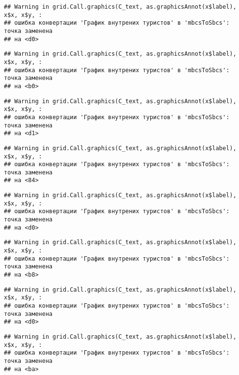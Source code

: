 \documentclass[
]{article}
\begin{document}
\begin{verbatim}
## Warning in grid.Call.graphics(C_text, as.graphicsAnnot(x$label), x$x, x$y, :
## ошибка конвертации 'График внутрених туристов' в 'mbcsToSbcs': точка заменена
## на <d0>
\end{verbatim}

\begin{verbatim}
## Warning in grid.Call.graphics(C_text, as.graphicsAnnot(x$label), x$x, x$y, :
## ошибка конвертации 'График внутрених туристов' в 'mbcsToSbcs': точка заменена
## на <b0>
\end{verbatim}

\begin{verbatim}
## Warning in grid.Call.graphics(C_text, as.graphicsAnnot(x$label), x$x, x$y, :
## ошибка конвертации 'График внутрених туристов' в 'mbcsToSbcs': точка заменена
## на <d1>
\end{verbatim}

\begin{verbatim}
## Warning in grid.Call.graphics(C_text, as.graphicsAnnot(x$label), x$x, x$y, :
## ошибка конвертации 'График внутрених туристов' в 'mbcsToSbcs': точка заменена
## на <84>
\end{verbatim}

\begin{verbatim}
## Warning in grid.Call.graphics(C_text, as.graphicsAnnot(x$label), x$x, x$y, :
## ошибка конвертации 'График внутрених туристов' в 'mbcsToSbcs': точка заменена
## на <d0>
\end{verbatim}

\begin{verbatim}
## Warning in grid.Call.graphics(C_text, as.graphicsAnnot(x$label), x$x, x$y, :
## ошибка конвертации 'График внутрених туристов' в 'mbcsToSbcs': точка заменена
## на <b8>
\end{verbatim}

\begin{verbatim}
## Warning in grid.Call.graphics(C_text, as.graphicsAnnot(x$label), x$x, x$y, :
## ошибка конвертации 'График внутрених туристов' в 'mbcsToSbcs': точка заменена
## на <d0>
\end{verbatim}

\begin{verbatim}
## Warning in grid.Call.graphics(C_text, as.graphicsAnnot(x$label), x$x, x$y, :
## ошибка конвертации 'График внутрених туристов' в 'mbcsToSbcs': точка заменена
## на <ba>
\end{verbatim}
\end{document}
